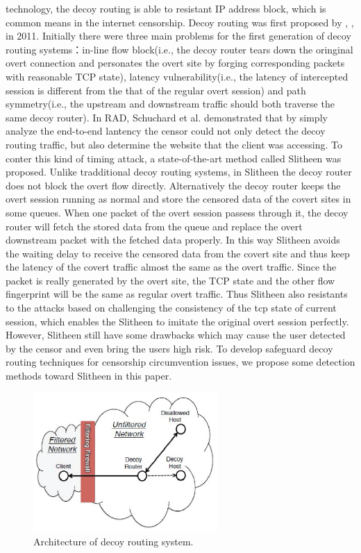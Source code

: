 \documentclass[conference]{IEEEtran}
\begin{document}
technology, the decoy routing is able to resistant IP address block, which is common means in the internet censorship. Decoy routing was first proposed by \cite{cirripede}, \cite{curveball}, \cite{telex} in 2011. Initially there were three main problems for the first generation of decoy routing systems：in-line flow block(i.e., the decoy router tears down the oringinal overt connection and personates the overt site by forging corresponding packets with reasonable TCP state), latency vulnerability(i.e., the latency of intercepted session is different from the that of the regular overt session) and path symmetry(i.e., the upstream and downstream traffic should both traverse the same decoy router). In RAD\cite{rad}, Schuchard et al. demonstrated that by simply analyze the end-to-end lantency the censor could not only detect the decoy routing traffic, but also determine the website that the client was accessing. To conter this kind of timing attack, a state-of-the-art method called Slitheen was proposed. Unlike tradditional decoy routing systems, in Slitheen the decoy router does not block the overt flow directly. Alternatively the decoy router keeps the overt session running as normal and store the censored data of the covert sites in some queues. When one packet of the overt session passess through it, the decoy router will fetch the stored data from the queue and replace the overt downstream packet with the fetched data properly. In this way Slitheen avoids the waiting delay to receive the censored data from the covert site and thus keep the latency of the covert traffic almost the same as the overt traffic. Since the packet is really generated by the overt site, the TCP state and the other flow fingerprint will be the same as regular overt traffic. Thus Slitheen also resistants to the attacks based on challenging the consistency of the tcp state of current session, which enables the Slitheen to imitate the original overt session perfectly. However, Slitheen still have some drawbacks which may cause the user detected by the censor and even bring the users high risk. To develop safeguard decoy routing techniques for censorship circumvention issues, we propose some detection methods toward Slitheen in this paper.
\begin{figure}[htbp]
	\centerline{\includegraphics[width=7cm]{Figure1.eps}}
	\caption{Architecture of decoy routing system.}
	\label{fig}
\end{figure} 
\end{document}
